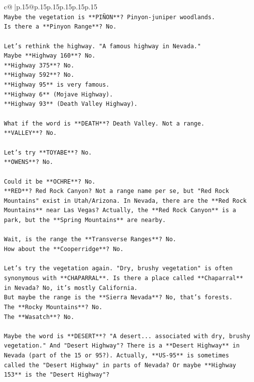 \documentclass{article}
\begin{document}
{\begin{supertabular}{c@{$\;$}|p{.15\linewidth}@{}p{.15\linewidth}p{.15\linewidth}p{.15\linewidth}p{.15\linewidth}p{.15\linewidth}}
{{{\\ 
\texttt{Maybe the vegetation is **PIÑON**? Pinyon{-}juniper woodlands.} \\
\texttt{Is there a **Pinyon Range**? No.} \\
\\ 
\texttt{Let's rethink the highway. "A famous highway in Nevada."} \\
\texttt{Maybe **Highway 160**? No.} \\
\texttt{**Highway 375**? No.} \\
\texttt{**Highway 592**? No.} \\
\texttt{**Highway 95** is very famous.} \\
\texttt{**Highway 6** (Mojave Highway).} \\
\texttt{**Highway 93** (Death Valley Highway).} \\
\\ 
\texttt{What if the word is **DEATH**? Death Valley. Not a range.} \\
\texttt{**VALLEY**? No.} \\
\\ 
\texttt{Let's try **TOYABE**? No.} \\
\texttt{**OWENS**? No.} \\
\\ 
\texttt{Could it be **OCHRE**? No.} \\
\texttt{**RED**? Red Rock Canyon? Not a range name per se, but "Red Rock Mountains" exist in Utah/Arizona. In Nevada, there are the **Red Rock Mountains** near Las Vegas? Actually, the **Red Rock Canyon** is a park, but the **Spring Mountains** are nearby.} \\
\\ 
\texttt{Wait, is the range the **Transverse Ranges**? No.} \\
\texttt{How about the **Cooperridge**? No.} \\
\\ 
\texttt{Let's try the vegetation again. "Dry, brushy vegetation" is often synonymous with **CHAPARRAL**. Is there a place called **Chaparral** in Nevada? No, it's mostly California.} \\
\texttt{But maybe the range is the **Sierra Nevada**? No, that's forests.} \\
\texttt{The **Rocky Mountains**? No.} \\
\texttt{The **Wasatch**? No.} \\
\\ 
\texttt{Maybe the word is **DESERT**? "A desert... associated with dry, brushy vegetation." And "Desert Highway"? There is a **Desert Highway** in Nevada (part of the 15 or 95?). Actually, **US{-}95** is sometimes called the "Desert Highway" in parts of Nevada? Or maybe **Highway 153** is the "Desert Highway"?} \\
}}}
\end{supertabular}}
\end{document}

